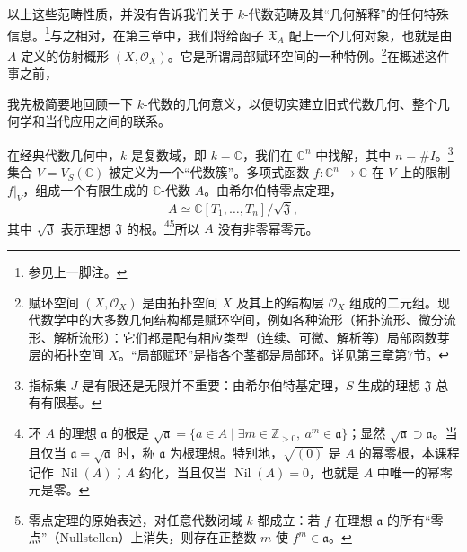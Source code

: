 以上这些范畴性质，并没有告诉我们关于 $k$-代数范畴及其“几何解释”的任何特殊信息。\footnote{参见上一脚注。}与之相对，在第三章中，我们将给函子 $\mathfrak X_A$ 配上一个几何对象，也就是由 $A$ 定义的仿射概形 $(X,\mathcal O_X)$。它是所谓局部赋环空间的一种特例。\footnote{赋环空间 $(X,\mathcal O_X)$ 是由拓扑空间 $X$ 及其上的结构层 $\mathcal O_X$ 组成的二元组。现代数学中的大多数几何结构都是赋环空间，例如各种流形（拓扑流形、微分流形、解析流形）：它们都是配有相应类型（连续、可微、解析等）局部函数芽层的拓扑空间 $X$。“局部赋环”是指各个茎都是局部环。详见第三章第7节。}在概述这件事之前，

我先极简要地回顾一下 $k$-代数的几何意义，以便切实建立旧式代数几何、整个几何学和当代应用之间的联系。

在经典代数几何中，$k$ 是复数域，即 $k=\mathbb C$，我们在 $\mathbb C^n$ 中找解，其中 $n=\#I$。\footnote{指标集 $J$ 是有限还是无限并不重要：由希尔伯特基定理，$S$ 生成的理想 $\mathfrak J$ 总有有限基。}集合 $V=V_S(\mathbb C)$ 被定义为一个“代数簇”。多项式函数 $f:\mathbb C^n\to\mathbb C$ 在 $V$ 上的限制 $f|_V$，组成一个有限生成的 $\mathbb C$-代数 $A$。由希尔伯特零点定理，
\[
A\simeq\mathbb C[T_1,\ldots,T_n]/\sqrt{\mathfrak J},
\]
其中 $\sqrt{\mathfrak J}$ 表示理想 $\mathfrak J$ 的根。\footnote{环 $A$ 的理想 $\mathfrak a$ 的根是 $\sqrt{\mathfrak a}=\{a\in A\mid \exists m\in\mathbb Z_{>0},\ a^m\in\mathfrak a\}$；显然 $\sqrt{\mathfrak a}\supset\mathfrak a$。当且仅当 $\mathfrak a=\sqrt{\mathfrak a}$ 时，称 $\mathfrak a$ 为根理想。特别地，$\sqrt{(0)}$ 是 $A$ 的幂零根，本课程记作 $\operatorname{Nil}(A)$；$A$ 约化，当且仅当 $\operatorname{Nil}(A)=0$，也就是 $A$ 中唯一的幂零元是零。}\footnote{零点定理的原始表述，对任意代数闭域 $k$ 都成立：若 $f$ 在理想 $\mathfrak a$ 的所有“零点”（Nullstellen）上消失，则存在正整数 $m$ 使 $f^m\in\mathfrak a$。}所以 $A$ 没有非零幂零元。

